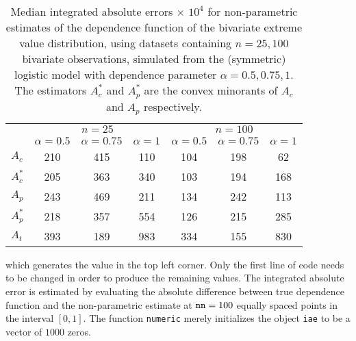 \documentclass[11pt,a4paper]{article}
\begin{document}
\begin{table}
\begin{center}
\begin{tabular}{|l|ccc|ccc|} \hline
 &  \multicolumn{3}{c|}{$n=25$} & \multicolumn{3}{c|}{$n=100$} \\
 & $\alpha = 0.5$ & $\alpha = 0.75$ & $\alpha = 1$ & $\alpha = 0.5$ & $\alpha = 0.75$ & $\alpha = 1$  \\ \hline

$A_c$     & 210 & 415 & 110  & 104 & 198 &  62   \\
$A_c^*$   & 205 & 363 & 340  & 103 & 194 & 168   \\
$A_p$     & 243 & 469 & 211  & 134 & 242 & 113   \\
$A_p^*$   & 218 & 357 & 554  & 126 & 215 & 285   \\
$A_t$     & 393 & 189 & 983  & 334 & 155 & 830   \\ \hline
\end{tabular}
 \caption{Median integrated absolute errors $\times$ $10^4$ for non-parametric estimates of the dependence function of the bivariate extreme value distribution, using datasets containing $n=25,100$ bivariate observations, simulated from the (symmetric) logistic model with dependence parameter $\alpha=0.5,0.75,1$. The estimators $A_c^*$ and $A_p^*$ are the convex minorants of $A_c$ and $A_p$ respectively.}
\label{simtab}
\end{center}
\end{table} 

which generates the value in the top left corner.
Only the first line of code needs to be changed in order to produce the remaining values.
The integrated absolute error is estimated by evaluating the absolute difference between true dependence function and the non-parametric estimate at $\verb+nn+ = 100$ equally spaced points in the interval $[0,1]$.
The function \verb+numeric+ merely initializes the object \verb+iae+ to be a vector of $1000$ zeros.


\end{document}
